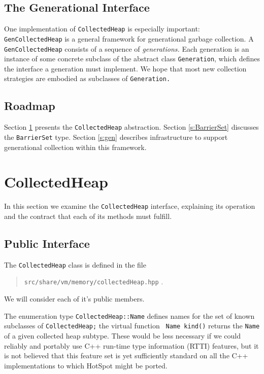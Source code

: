 \documentclass{article}
\begin{document}
\subsection{The Generational Interface}

One implementation of {\tt CollectedHeap} is especially important:
{\tt GenCollectedHeap} is a general framework for generational garbage
collection.  A {\tt GenCollectedHeap} consists of a sequence of {\em
generations.}  Each generation is an instance of some concrete
subclass of the abstract class {\tt Generation}, which defines the
interface a generation must implement.  We hope that most new
collection strategies are embodied as subclasses of {\tt Generation.}

\subsection{Roadmap}

Section \ref{s:ch} presents the {\tt CollectedHeap} abstraction.
Section \ref{s:BarrierSet} discusses the {\tt BarrierSet} type.
Section \ref{s:gen} describes infrastructure to support
generational collection within this framework.

\section{CollectedHeap}
\label{s:ch}

In this section we examine the {\tt CollectedHeap} interface,
explaining its operation and the contract that each of its methods
must fulfill.

\subsection{Public Interface}
\label{ch:public}

The {\tt CollectedHeap} class is defined in the file
\begin{quote}
    {\tt src/share/vm/memory/collectedHeap.hpp} \quad .
\end{quote}
We will consider each of it's public members.

The enumeration type {\tt CollectedHeap::Name} defines names for the set
of known subclasses of {\tt CollectedHeap;} the virtual function {\tt
Name kind()} returns the {\tt Name} of a given collected heap subtype.
These would be less necessary if we could reliably and portably use
C++ run-time type information (RTTI) features, but it is not believed
that this feature set is yet sufficiently standard on all the C++
implementations to which HotSpot might be ported.
\end{document}
